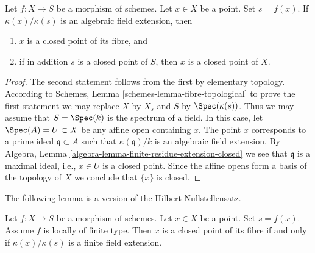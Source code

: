 \begin{lemma}
\label{lemma-algebraic-residue-field-extension-closed-point-fibre}
Let $f : X \to S$ be a morphism of schemes.
Let $x \in X$ be a point. Set $s = f(x)$.
If $\kappa(x)/\kappa(s)$
is an algebraic field extension, then
\begin{enumerate}
\item $x$ is a closed point of its fibre, and
\item if in addition $s$ is a closed point of $S$, then
$x$ is a closed point of $X$.
\end{enumerate}
\end{lemma}

\begin{proof}
The second statement follows from the first by elementary topology.
According to Schemes, Lemma \ref{schemes-lemma-fibre-topological}
to prove the first statement
we may replace $X$ by $X_s$ and $S$ by $\Spec(\kappa(s))$.
Thus we may assume that $S = \Spec(k)$ is the spectrum of a field.
In this case, let $\Spec(A) = U \subset X$ be any affine open
containing $x$. The point $x$ corresponds to a prime ideal
$\mathfrak q \subset A$ such that $\kappa(\mathfrak q)/k$
is an algebraic field extension. By
Algebra, Lemma \ref{algebra-lemma-finite-residue-extension-closed}
we see that $\mathfrak q$ is a maximal ideal, i.e., $x \in U$ is a
closed point. Since the affine opens form
a basis of the topology of $X$ we conclude that $\{x\}$ is closed.
\end{proof}

\noindent
The following lemma is a version of the Hilbert Nullstellensatz.

\begin{lemma}
\label{lemma-closed-point-fibre-locally-finite-type}
Let $f : X \to S$ be a morphism of schemes.
Let $x \in X$ be a point. Set $s = f(x)$.
Assume $f$ is locally of finite type.
Then $x$ is a closed point of its fibre
if and only if $\kappa(x)/\kappa(s)$ is
a finite field extension.
\end{lemma}


